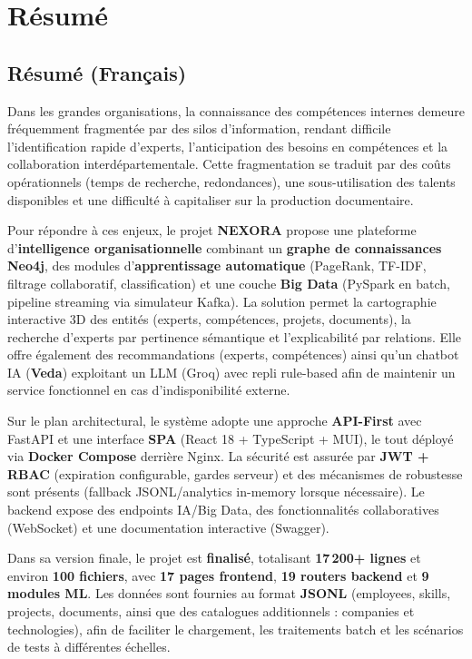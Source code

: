 \documentclass[12pt,a4paper]{report}
\begin{document}
\chapter*{Résumé}

\section*{Résumé (Français)}
Dans les grandes organisations, la connaissance des compétences internes demeure fréquemment fragmentée par des silos d'information, rendant difficile l'identification rapide d'experts, l'anticipation des besoins en compétences et la collaboration interdépartementale. Cette fragmentation se traduit par des coûts opérationnels (temps de recherche, redondances), une sous-utilisation des talents disponibles et une difficulté à capitaliser sur la production documentaire.

Pour répondre à ces enjeux, le projet \textbf{NEXORA} propose une plateforme d'\textbf{intelligence organisationnelle} combinant un \textbf{graphe de connaissances Neo4j}, des modules d'\textbf{apprentissage automatique} (PageRank, TF-IDF, filtrage collaboratif, classification) et une couche \textbf{Big Data} (PySpark en batch, pipeline streaming via simulateur Kafka). La solution permet la cartographie interactive 3D des entités (experts, compétences, projets, documents), la recherche d'experts par pertinence sémantique et l'explicabilité par relations. Elle offre également des recommandations (experts, compétences) ainsi qu'un chatbot IA (\textbf{Veda}) exploitant un LLM (Groq) avec repli rule-based afin de maintenir un service fonctionnel en cas d'indisponibilité externe.

Sur le plan architectural, le système adopte une approche \textbf{API-First} avec FastAPI et une interface \textbf{SPA} (React 18 + TypeScript + MUI), le tout déployé via \textbf{Docker Compose} derrière Nginx. La sécurité est assurée par \textbf{JWT + RBAC} (expiration configurable, gardes serveur) et des mécanismes de robustesse sont présents (fallback JSONL/analytics in-memory lorsque nécessaire). Le backend expose des endpoints IA/Big Data, des fonctionnalités collaboratives (WebSocket) et une documentation interactive (Swagger).

Dans sa version finale, le projet est \textbf{finalisé}, totalisant \textbf{17\,200+ lignes} et environ \textbf{100 fichiers}, avec \textbf{17 pages frontend}, \textbf{19 routers backend} et \textbf{9 modules ML}. Les données sont fournies au format \textbf{JSONL} (employees, skills, projects, documents, ainsi que des catalogues additionnels : companies et technologies), afin de faciliter le chargement, les traitements batch et les scénarios de tests à différentes échelles.
\end{document}
